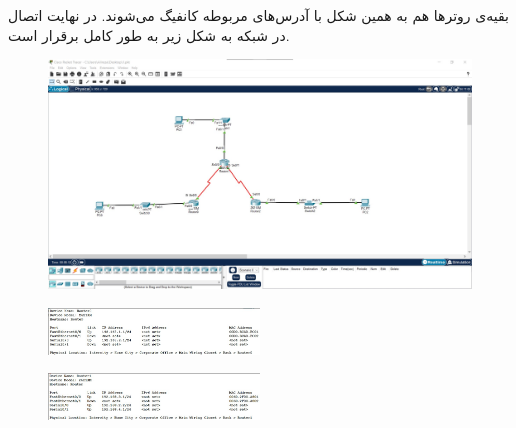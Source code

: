 \documentclass{article}
\begin{document}
بقیه‌ی روترها هم به همین شکل با آدرس‌های مربوطه کانفیگ می‌شوند. در نهایت اتصال در شبکه به شکل زیر به طور کامل برقرار است.
\begin{figure}[H]
    \centering
    \includegraphics[width=1.0\textwidth]{figures/7.jpg}
    \caption{}
    \label{fig:fig1}
\end{figure}
\begin{figure}[H]
    \centering
    \includegraphics[width=0.5\textwidth]{figures/8.jpg}
    \caption{}
    \label{fig:fig1}
\end{figure}
\begin{figure}[H]
    \centering
    \includegraphics[width=0.5\textwidth]{figures/9.jpg}
    \caption{}
    \label{fig:fig1}
\end{figure}
\end{document}
